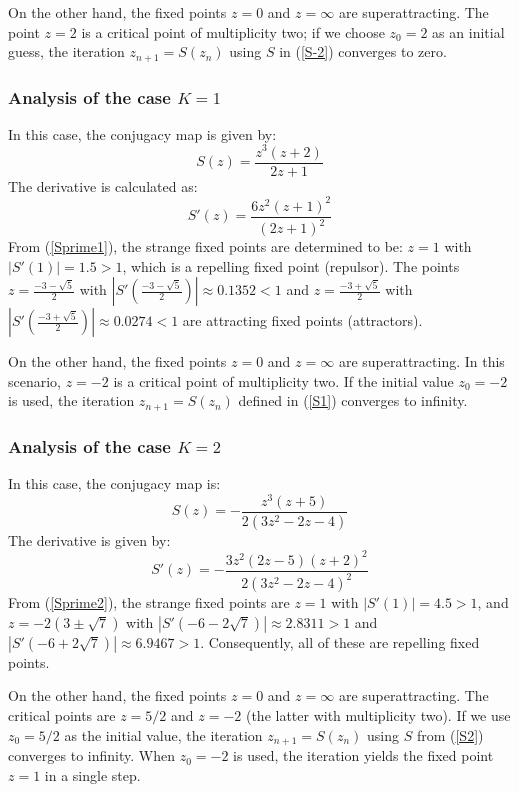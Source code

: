\documentclass{article}
\theoremstyle{definition}
\theoremstyle{remark}
\begin{document}
On the other hand, the fixed points $z=0$ and $z=\infty$ are superattracting. The point $z=2$ is a critical point of multiplicity two; if we choose $z_0=2$ as an initial guess, the iteration $z_{n+1}=S(z_n)$ using $S$ in (\ref{S-2}) converges to zero.

\subsubsection{Analysis of the case $K=1$}
In this case, the conjugacy map is given by:
\begin{equation}\label{S1}
	S(z) = \frac{z^3(z+2)}{2z+1}
\end{equation}
The derivative is calculated as:
\begin{equation}\label{Sprime1}
	S'(z) = \frac{6z^2(z+1)^2}{(2z+1)^2}
\end{equation}
From (\ref{Sprime1}), the strange fixed points are determined to be:
$z=1$ with $|S'(1)| = 1.5 > 1$, which is a repelling fixed point (repulsor). The points $z=\frac{-3-\sqrt{5}}{2}$ with $|S'(\frac{-3-\sqrt{5}}{2})| \approx 0.1352 < 1$ and $z=\frac{-3+\sqrt{5}}{2}$ with $|S'(\frac{-3+\sqrt{5}}{2})| \approx 0.0274 < 1$ are attracting fixed points (attractors).

On the other hand, the fixed points $z=0$ and $z=\infty$ are superattracting. In this scenario, $z=-2$ is a critical point of multiplicity two. If the initial value $z_0=-2$ is used, the iteration $z_{n+1}=S(z_n)$ defined in (\ref{S1}) converges to infinity.


\subsubsection{Analysis of the case $K=2$}
In this case, the conjugacy map is:
\begin{equation}\label{S2}
	S(z)=-\frac{z^3(z+5)}{2(3z^2-2z-4)}
\end{equation}
The derivative is given by:
\begin{equation}\label{Sprime2}
	S'(z)=-\frac{3z^2(2z-5)(z+2)^2}{2\left(3z^2-2z-4\right)^2}
\end{equation}
From (\ref{Sprime2}), the strange fixed points are $z=1$ with $|S'(1)|=4.5 > 1$, and $z=-2(3\pm \sqrt{7})$ with $|S'(-6-2\sqrt{7})| \approx 2.8311 > 1$ and $|S'(-6+2\sqrt{7})| \approx 6.9467 > 1$. Consequently, all of these are repelling fixed points.

On the other hand, the fixed points $z=0$ and $z=\infty$ are superattracting. The critical points are $z=5/2$ and $z=-2$ (the latter with multiplicity two). If we use $z_0=5/2$ as the initial value, the iteration $z_{n+1}=S(z_n)$ using $S$ from (\ref{S2}) converges to infinity. When $z_0=-2$ is used, the iteration yields the fixed point $z=1$ in a single step.
\end{document}
